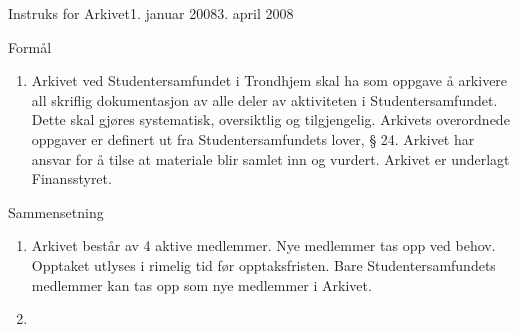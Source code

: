 \begin{instruks}{Instruks for Arkivet}{1. januar 2008}{3. april 2008}
    
    \begin{instruksledd}{Formål}
        \begin{enumerate}
            \item Arkivet ved Studentersamfundet i Trondhjem skal ha som oppgave å
                arkivere all skriflig dokumentasjon av alle deler av aktiviteten i
                Studentersamfundet. Dette skal gjøres systematisk, oversiktlig og
                tilgjengelig. Arkivets overordnede oppgaver er definert ut fra
                Studentersamfundets lover, § 24. Arkivet har ansvar for å tilse at
                materiale blir samlet inn og vurdert. Arkivet er underlagt Finansstyret.
        \end{enumerate}
    \end{instruksledd}

    \begin{instruksledd}{Sammensetning}
        \begin{enumerate}
            \item Arkivet består av 4 aktive medlemmer. Nye medlemmer tas opp ved behov.
                Opptaket utlyses i rimelig tid før opptaksfristen. Bare
                Studentersamfundets medlemmer kan tas opp som nye medlemmer i Arkivet.
            \item
        \end{enumerate}
    \end{instruksledd}

\end{instruks}



